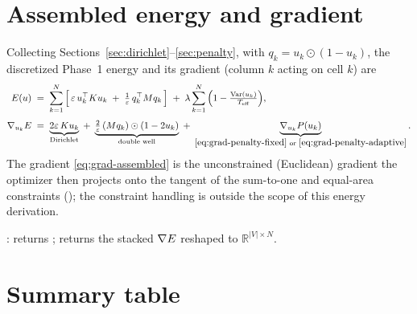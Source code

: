 \documentclass[11pt,a4paper]{article}
\begin{document}
\section{Assembled energy and gradient}
\label{sec:assembly}

Collecting Sections~\ref{sec:dirichlet}--\ref{sec:penalty}, with
$q_k = u_k \odot (1-u_k)$, the discretized Phase~1 energy and its gradient (column
$k$ acting on cell $k$) are
\begin{align}
  E(u)
  &\;=\;
  \sum_{k=1}^{N}\Big[\,
    \varepsilon\, u_k^\top K u_k
    \;+\;
    \tfrac{1}{\varepsilon}\, q_k^\top M q_k
  \,\Big]
  \;+\;
  \lambda \sum_{k=1}^{N}\Big(1 - \tfrac{\operatorname{Var}(u_k)}{T_{\mathrm{eff}}}\Big),
  \label{eq:E-assembled}\\[4pt]
  \nabla_{u_k} E
  &\;=\;
  \underbrace{2\varepsilon\, K u_k}_{\text{Dirichlet}}
  \;+\;
  \underbrace{\tfrac{2}{\varepsilon}\,(M q_k)\odot(1-2u_k)}_{\text{double well}}
  \;+\;
  \underbrace{\nabla_{u_k} P(u_k)}_{\eqref{eq:grad-penalty-fixed}\text{ or }\eqref{eq:grad-penalty-adaptive}}.
  \label{eq:grad-assembled}
\end{align}
The gradient \eqref{eq:grad-assembled} is the unconstrained (Euclidean) gradient the
optimizer then projects onto the tangent of the sum-to-one and equal-area constraints
(); the constraint handling is outside the
scope of this energy derivation.

\begin{tcolorbox}[colback=blue!4!white, colframe=blue!40!black,
                  title={Code: assembled energy and gradient}, fontupper=\small]
:
 returns
;
 returns the stacked $\nabla E$ reshaped to
$\mathbb{R}^{|V|\times N}$.
\end{tcolorbox}

\section*{Summary table}
\end{document}
